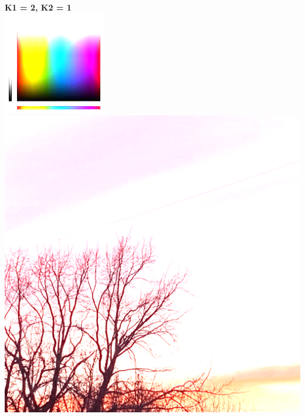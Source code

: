 \documentclass{article}
\begin{document}
{\bf K1 = 2, K2 = 1\/}\\
\includegraphics[totalheight = 4cm]{121.png} \hspace{1.5cm}
\includegraphics[totalheight = 4cm]{221.png} \hspace{1.5cm}
\end{document}
